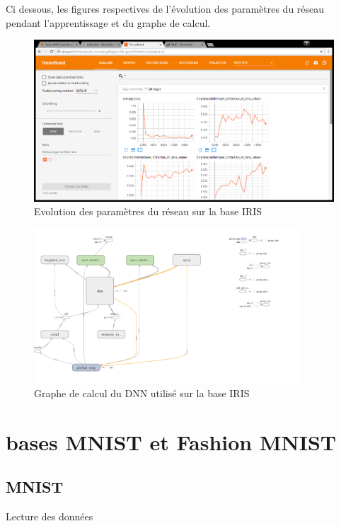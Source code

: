 \documentclass[a4paper,11pt]{book}
\theoremstyle{theo}
\begin{document}
Ci dessous, les figures respectives de l'évolution des paramètres du réseau pendant l'apprentissage et du graphe de calcul.
\begin{figure}[H]

\begin{center}
\includegraphics[width=16cm]{./figures/TensorBoardIrisDnn.png} 
\end{center}
\caption{Evolution des paramètres du réseau sur la base IRIS}
\end{figure}

\begin{figure}[H]

\begin{center}
\includegraphics[width=10cm]{./figures/graphIrisDNN.png} 
\end{center}
\caption{Graphe de calcul du DNN utilisé sur la base IRIS}
\end{figure}

\chapter{bases MNIST et Fashion MNIST}
\section{MNIST}
Lecture des données
\end{document}
